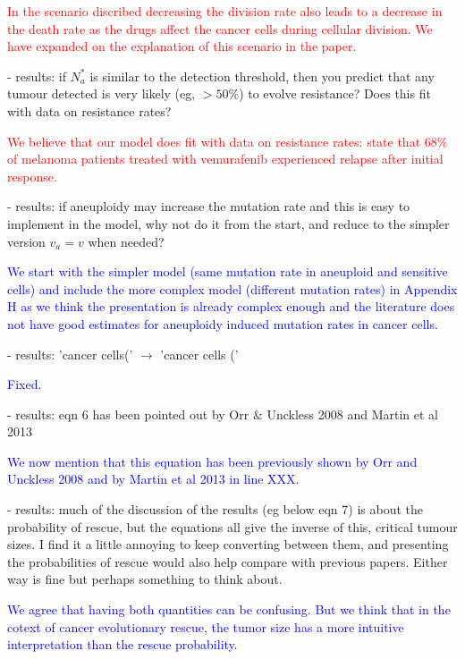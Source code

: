 \documentclass[12pt]{extarticle}
\begin{document}
\textcolor{red}{%
In the scenario discribed decreasing the division rate also leads to a decrease in the death rate as the drugs affect the cancer cells during cellular division. We have expanded on the explanation of this scenario in the paper.
} 

- results: if $N_a^*$ is similar to the detection threshold, then you predict that any tumour detected is very likely (eg, $>50\%$) to evolve resistance? Does this fit with data on resistance rates?

\textcolor{red}{ %
We believe that our model does fit with data on resistance rates: \citep{handa2022long} state that 68$\%$ of melanoma patients treated with vemurafenib experienced relapse after initial response. } %

- results: if aneuploidy may increase the mutation rate and this is easy to implement in the model, why not do it from the start, and reduce to the simpler version $v_a=v$ when needed?

\textcolor{blue}{
We start with the simpler model (same mutation rate in aneuploid and sensitive cells) and include the more complex model (different mutation rates) in Appendix H as we think the presentation is already complex enough and the literature does not have good estimates for aneuploidy induced mutation rates in cancer cells.
} 

- results: 'cancer cells(' $\rightarrow$ 'cancer cells ('

\textcolor{blue}{Fixed.} %

- results: eqn 6 has been pointed out by Orr $\&$ Unckless 2008 and Martin et al 2013

\textcolor{blue}{%
We now mention that this equation has been previously shown by Orr and Unckless 2008 and by Martin et al 2013 in line XXX.
} 

- results: much of the discussion of the results (eg below eqn 7) is about the probability of rescue, but the equations all give the inverse of this, critical tumour sizes. I find it a little annoying to keep converting between them, and presenting the probabilities of rescue would also help compare with previous papers. Either way is fine but perhaps something to think about.

\textcolor{blue}{
We agree that having both quantities can be confusing. But we think that in the cotext of cancer evolutionary rescue, the tumor size has a more intuitive interpretation than the rescue probability.
}
\end{document}
